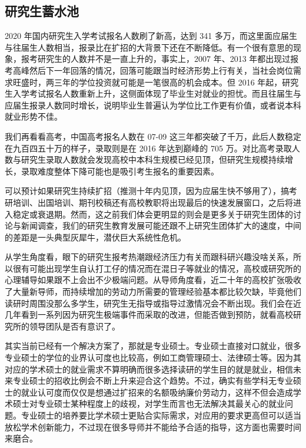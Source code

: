 \documentclass[]{tufte-book}
\begin{document}
\hypertarget{ux7814ux7a76ux751fux84c4ux6c34ux6c60}{%
\subsection{研究生蓄水池}\label{ux7814ux7a76ux751fux84c4ux6c34ux6c60}}

2020 年国内研究生入学考试报名人数刷了新高，达到 341 多万，而这里面应届生与往届生人数相当，报录比在扩招的大背景下还在不断降低。有一个很有意思的现象，报考研究生的人数并不是一直上升的，事实上，2007 年、2013 年都出现过报考高峰然后下一年回落的情况，回落可能跟当时经济形势上行有关，当社会岗位需求旺盛时，两三年的学位投资就可能是一笔很高的机会成本。但 2016 年起，研究生入学考试报名人数重新上升，这侧面体现了毕业生对就业的担忧。而且往届生与应届生报录人数同时增长，说明毕业生普遍认为学位比工作更有价值，或者说本科就业形势不佳。

我们再看看高考，中国高考报名人数在 07-09 这三年都突破了千万，此后人数稳定在九百四五十万的样子，录取则是在 2016 年达到巅峰的 705 万。对比高考录取人数与研究生录取人数就会发现高校中本科生规模已经见顶，但研究生规模持续增长，录取难度整体下降可能也是吸引考生报名的重要因素。

可以预计如果研究生持续扩招（推测十年内见顶，因为应届生快不够用了），搞考研培训、出国培训、期刊校稿还有高校教职将出现最后的快速发展窗口，之后将进入稳定或衰退期。然而，这之前我们体会更明显的则会是更多关于研究生团体的讨论与新闻调查，我们的研究生教育发展可能还跟不上研究生团体扩大的速度，中间的差距是一头典型灰犀牛，潜伏巨大系统性危机。

从学生角度看，眼下的研究生报考热潮跟经济压力有关而跟科研兴趣没啥关系，所以很有可能出现学生自认打工仔的情况而在混日子等就业的情况，高校或研究所的心理辅导如果跟不上会出不少极端问题。从导师角度看，近二十年的高校扩张吸收了大量新导师，而持续增加的劳动力所需要的管理经验基本都比较欠缺，毕竟他们读研时周围没那么多学生，研究生无指导或指导过激情况会不断出现。我们会在近几年看到一系列因为研究生极端事件而采取的改进，但能否做到预防，就看高校研究所的领导团队是否有意识了。

其实当前已经有一个解决方案了，那就是专业硕士。专业硕士直接对口就业，很多专业硕士的学位的业界认可度也比较高，例如工商管理硕士、法律硕士等。因为其对应的学术硕士的就业需求不算明确而很多选择读研的学生目的就是就业，相信未来专业硕士的招收比例会不断上升来迎合这个趋势。不过，确实有些学科无专业硕士的就业认可度而仅仅是想通过扩招来的名额吸纳廉价劳动力，这样不但会造成学术硕士对专业硕士某种程度上的歧视，对学生而言也无法解决其最关心的就业问题。专业硕士的培养要比学术硕士更贴合实际需求，对应用的要求更高但可以适当放松学术创新能力，不过现在很多导师并不能给予合适的指导，这方面也需要时间来磨合。
\end{document}
